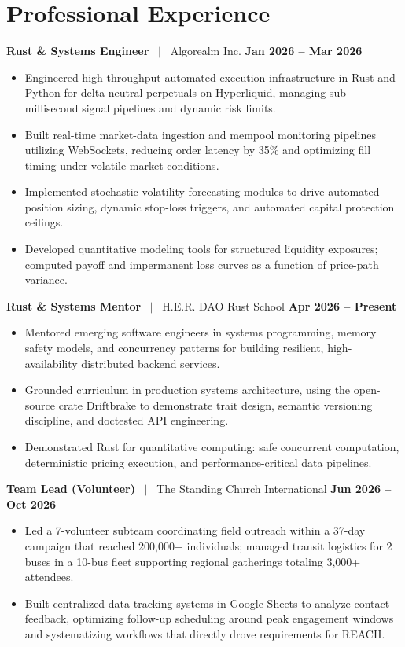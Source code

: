 \documentclass[10pt,a4paper]{article}
\begin{document}
\section{Professional Experience}

\textbf{Rust \& Systems Engineer} \ $|$ \ Algorealm Inc. \hfill \textbf{Jan 2026 -- Mar 2026}
\begin{itemize}
    \item Engineered high-throughput automated execution infrastructure in Rust and Python for delta-neutral perpetuals on Hyperliquid, managing sub-millisecond signal pipelines and dynamic risk limits.
    \item Built real-time market-data ingestion and mempool monitoring pipelines utilizing WebSockets, reducing order latency by 35\% and optimizing fill timing under volatile market conditions.
    \item Implemented stochastic volatility forecasting modules to drive automated position sizing, dynamic stop-loss triggers, and automated capital protection ceilings.
    \item Developed quantitative modeling tools for structured liquidity exposures; computed payoff and impermanent loss curves as a function of price-path variance.
\end{itemize}

\textbf{Rust \& Systems Mentor} \ $|$ \ H.E.R. DAO Rust School \hfill \textbf{Apr 2026 -- Present}
\begin{itemize}
    \item Mentored emerging software engineers in systems programming, memory safety models, and concurrency patterns for building resilient, high-availability distributed backend services.
    \item Grounded curriculum in production systems architecture, using the open-source crate Driftbrake to demonstrate trait design, semantic versioning discipline, and doctested API engineering.
    \item Demonstrated Rust for quantitative computing: safe concurrent computation, deterministic pricing execution, and performance-critical data pipelines.
\end{itemize}

\textbf{Team Lead (Volunteer)} \ $|$ \ The Standing Church International \hfill \textbf{Jun 2026 -- Oct 2026}
\begin{itemize}
    \item Led a 7-volunteer subteam coordinating field outreach within a 37-day campaign that reached 200,000+ individuals; managed transit logistics for 2 buses in a 10-bus fleet supporting regional gatherings totaling 3,000+ attendees.
    \item Built centralized data tracking systems in Google Sheets to analyze contact feedback, optimizing follow-up scheduling around peak engagement windows and systematizing workflows that directly drove requirements for REACH.
\end{itemize}
\end{document}
